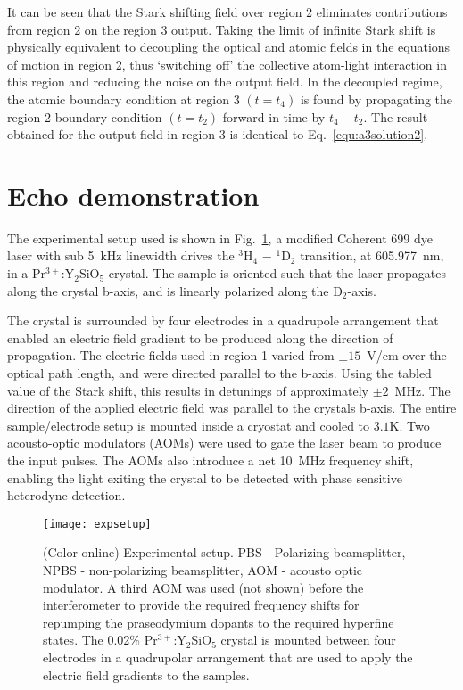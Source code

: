 \documentclass[superscriptaddress,pra,twocolumn,showpacs,amsmath,amssymb,aps,a4paper]{revtex4}
\newcommand{\PRYSO}{Pr$^{3+}$:Y$_2$SiO$_5$ }
\begin{document}
It can be seen that the Stark shifting field over region 2 eliminates
contributions from region 2 on the region 3 output. Taking the limit
of infinite Stark shift is physically equivalent to decoupling the
optical and atomic fields in the equations of motion in region 2, thus
`switching off' the collective atom-light interaction in this region
and reducing the noise on the output field. In the decoupled regime,
the atomic boundary condition at region 3 $(t = t_4)$ is found by
propagating the region 2 boundary condition $(t = t_2)$ forward in
time by $t_4 - t_2$. The result obtained for the output field in
region 3 is identical to Eq.~\ref{equ:a3solution2}.



\section{Echo demonstration}


The experimental setup used is shown in Fig.~\ref{fig:expsetup}, a
modified Coherent 699 dye laser with sub 5~kHz linewidth drives the
$^3$H$_4$ $-$ $^1$D$_2$ transition, at 605.977~nm, in a \PRYSO
crystal. The sample is oriented such that the laser
propagates along the crystal b-axis, and is linearly polarized along
the D$_2$-axis.

The crystal is surrounded by four electrodes in a quadrupole
arrangement that enabled an electric field gradient to be produced
along the direction of propagation. The electric fields used in region
1 varied from $\pm15$~V/cm over the optical path length, and were
directed parallel to the b-axis. Using the tabled value of the Stark
shift\cite{graf98}, this results in detunings of approximately
$\pm2$~MHz. The direction of the applied electric field was parallel
to the crystals b-axis.  The entire sample/electrode setup is mounted
inside a cryostat and cooled to $3.1\textrm{K}$.  Two acousto-optic
modulators (AOMs) were used to gate the laser beam to produce the
input pulses. The AOMs also introduce a net 10~MHz frequency shift,
enabling the light exiting the crystal to be detected with phase
sensitive heterodyne detection.
 

\begin{figure}%
  \centering
  \texttt{[image: expsetup]}
\caption{\label{fig:expsetup}(Color online)
 Experimental setup. PBS - Polarizing beamsplitter, NPBS -
 non-polarizing beamsplitter, AOM - acousto optic modulator. A third
 AOM was used (not shown) before the interferometer to provide the
 required frequency shifts for repumping the praseodymium dopants to
 the required hyperfine states. 
 The  0.02\% \PRYSO crystal is mounted between four  electrodes in a
 quadrupolar arrangement that are used to apply the electric field
 gradients to the samples. 
 }
\end{figure}
\end{document}
